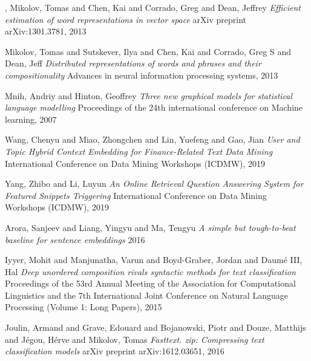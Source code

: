 \begin{thebibliography}{9}
,
Mikolov, Tomas and Chen, Kai and Corrado, Greg and Dean, Jeffrey\newline
\textit{Efficient estimation of word representations in vector space}\newline
arXiv preprint arXiv:1301.3781, 2013

Mikolov, Tomas and Sutskever, Ilya and Chen, Kai and Corrado, Greg S and Dean, Jeff\newline
\textit{Distributed representations of words and phrases and their compositionality}\newline
Advances in neural information processing systems, 2013

Mnih, Andriy and Hinton, Geoffrey\newline
\textit{Three new graphical models for statistical language modelling}\newline
Proceedings of the 24th international conference on Machine learning, 2007

Wang, Chenyu and Miao, Zhongchen and Lin, Yuefeng and Gao, Jian\newline
\textit{User and Topic Hybrid Context Embedding for Finance-Related Text Data Mining} International Conference on Data Mining Workshops (ICDMW), 2019

Yang, Zhibo and Li, Luyun\newline
\textit{An Online Retrieval Question Answering System for Featured Snippets Triggering} International Conference on Data Mining Workshops (ICDMW), 2019

Arora, Sanjeev and Liang, Yingyu and Ma, Tengyu\newline
\textit{A simple but tough-to-beat baseline for sentence embeddings}
2016

Iyyer, Mohit and Manjunatha, Varun and Boyd-Graber, Jordan and Daum{\'e} III, Hal\newline
\textit{Deep unordered composition rivals syntactic methods for text classification}\newline
Proceedings of the 53rd Annual Meeting of the Association for Computational Linguistics and the 7th International Joint Conference on Natural Language Processing (Volume 1: Long Papers), 2015

Joulin, Armand and Grave, Edouard and Bojanowski, Piotr and Douze, Matthijs and J{\'e}gou, H{\'e}rve and Mikolov, Tomas\newline
\textit{Fasttext. zip: Compressing text classification models}\newline
arXiv preprint arXiv:1612.03651, 2016


\end{thebibliography}
